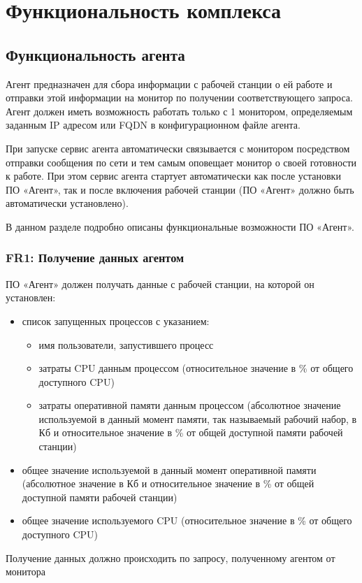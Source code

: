 \section{Функциональность комплекса }

\subsection{Функциональность агента}

Агент предназначен для сбора информации с рабочей станции о ей работе и отправки этой информации на монитор по получении соответствующего запроса. Агент должен иметь возможность работать только с 1 монитором, определяемым заданным IP адресом или FQDN в конфигурационном файле агента.

При запуске сервис агента автоматически связывается с монитором посредством отправки сообщения по сети и тем самым оповещает монитор о своей готовности к работе. При этом сервис агента стартует автоматически как после установки ПО  «Агент», так и после включения рабочей станции (ПО  «Агент» должно быть автоматически установлено).

В данном разделе подробно описаны функциональные возможности ПО  «Агент».

\subsubsection{FR1: Получение данных агентом}

ПО  «Агент» должен получать данные с рабочей станции, на которой он установлен:
\begin{itemize}
\item список запущенных процессов с указанием:
	\begin{itemize}
	\item имя пользователи, запустившего процесс
	\item затраты CPU данным процессом (относительное значение в \% от общего доступного CPU)
	\item затраты оперативной памяти данным процессом (абсолютное значение используемой в данный момент памяти, так называемый рабочий набор,  в Кб и относительное значение в \% от общей доступной памяти рабочей станции)
	\end{itemize}
\item общее значение используемой в данный момент оперативной памяти (абсолютное значение в Кб и относительное значение в \% от общей доступной памяти рабочей станции)
\item общее значение используемого CPU (относительное значение в \% от общего доступного CPU)
\end{itemize}
Получение данных должно происходить по запросу, полученному агентом от монитора

